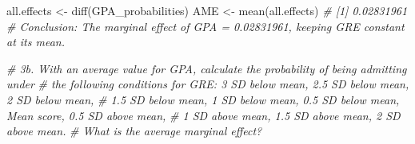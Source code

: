 \documentclass[
]{article}
\newenvironment{Shaded}{\begin{snugshade}}{\end{snugshade}}
\newcommand{\CommentTok}[1]{\textcolor[rgb]{0.56,0.35,0.01}{\textit{#1}}}
\newcommand{\FunctionTok}[1]{\textcolor[rgb]{0.00,0.00,0.00}{#1}}
\newcommand{\NormalTok}[1]{#1}
\newcommand{\OtherTok}[1]{\textcolor[rgb]{0.56,0.35,0.01}{#1}}
\begin{document}
\begin{Shaded}
\begin{Highlighting}[]
\NormalTok{all.effects }\OtherTok{\textless{}{-}} \FunctionTok{diff}\NormalTok{(GPA\_probabilities)}
\NormalTok{AME }\OtherTok{\textless{}{-}} \FunctionTok{mean}\NormalTok{(all.effects)  }\CommentTok{\# [1] 0.02831961}
\CommentTok{\# Conclusion: The marginal effect of GPA = 0.02831961, keeping GRE constant at its mean.  }



\CommentTok{\# 3b. With an average value for GPA, calculate the probability of being admitting under }
\CommentTok{\#     the following conditions for GRE: 3 SD below mean, 2.5 SD below mean, 2 SD below mean, }
\CommentTok{\#     1.5 SD below mean, 1 SD below mean, 0.5 SD below mean, Mean score, 0.5 SD above mean, }
\CommentTok{\#     1 SD above mean, 1.5 SD above mean, 2 SD above mean. }
\CommentTok{\#     What is the average marginal effect?    }
\end{Highlighting}
\end{Shaded}
\end{document}
